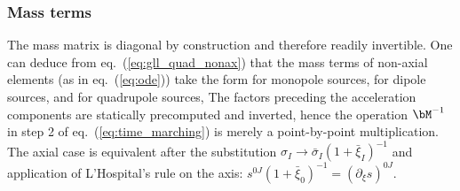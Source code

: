 \subsubsection{Mass terms}\label{section:mass}
%
The mass matrix is diagonal by construction
and therefore readily invertible. One can deduce from
eq.~(\ref{eq:gll_quad_nonax}) that the mass terms of non-axial elements
(as in eq.~(\ref{eq:ode})) take the form for monopole sources,
%
\eqa
{}
\ena
for dipole sources,
\eqa
{}
\ena
%
and for quadrupole sources,
\eqa
{}
\ena
%
The factors preceding the acceleration components are statically precomputed
and inverted, hence the operation $\bM^{-1}$ in step 2 of
eq.~(\ref{eq:time_marching}) is merely a point-by-point multiplication.
The axial case is equivalent after the substitution
$\sigma_I\rightarrow\bar{\sigma}_I(1+\bar{\xi}_I)^{-1}$ and application of
L'Hospital's rule on the axis:
$s^{0J}(1+\bar{\xi}_0)^{-1}=\left(\partial_\xi s\right)^{0J}$.
%
%
